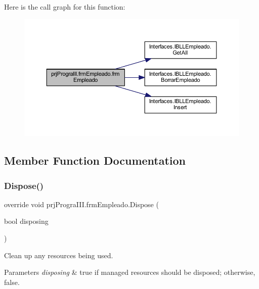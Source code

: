 Here is the call graph for this function\+:
\nopagebreak
\begin{figure}[H]
\begin{center}
\leavevmode
\includegraphics[width=350pt]{classprj_progra_i_i_i_1_1frm_empleado_a8e98a0755332ce950f8f863b4c364398_cgraph}
\end{center}
\end{figure}


\subsection{Member Function Documentation}
\hypertarget{classprj_progra_i_i_i_1_1frm_empleado_a4c45e76c6fe661b6cb37bcacbaedff9a}{}\label{classprj_progra_i_i_i_1_1frm_empleado_a4c45e76c6fe661b6cb37bcacbaedff9a} 
\subsubsection{\texorpdfstring{Dispose()}{Dispose()}}
{\footnotesize\ttfamily override void prj\+Progra\+I\+I\+I.\+frm\+Empleado.\+Dispose (\begin{DoxyParamCaption}\item[{bool}]{disposing }\end{DoxyParamCaption})\hspace{0.3cm}{\ttfamily [protected]}}



Clean up any resources being used. 


\begin{DoxyParams}{Parameters}
{\em disposing} & true if managed resources should be disposed; otherwise, false.\\
\hline
\end{DoxyParams}



